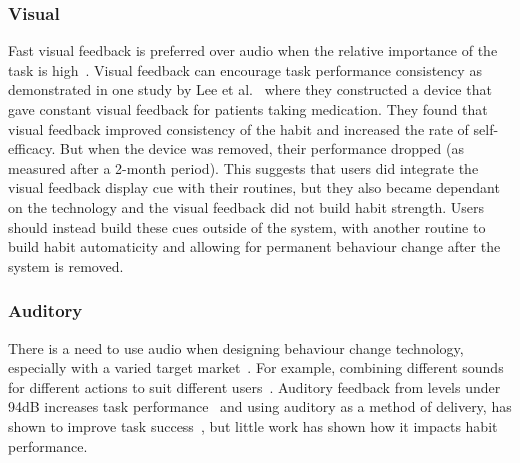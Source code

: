\subsubsection{Visual}
Fast visual feedback is preferred over audio when the relative importance of the task is high~\cite{visual_mode_better}. Visual feedback can encourage task performance consistency as demonstrated in one study by Lee et al.~\cite{article_realtime_feedback_improving_medication_taking} where they constructed a device that gave constant visual feedback for patients taking medication. They found that visual feedback improved consistency of the habit and increased the rate of self-efficacy. But when the device was removed, their performance dropped (as measured after a 2-month period). This suggests that users did integrate the visual feedback display cue with their routines, but they also became dependant on the technology and the visual feedback did not build habit strength. Users should instead build these cues outside of the system, with another routine to build habit automaticity and allowing for permanent behaviour change after the system is removed.

\subsubsection{Auditory}
There is a need to use audio when designing behaviour change technology, especially with a varied target market~\cite{article_designing_for_health_behaviour_change_hci}. For example, combining different sounds for different actions to suit different users~\cite{article_movipill_improving_medication_elders}. Auditory feedback from levels under 94dB increases task performance~\cite{high_audio_feedback_negative_performance} and using auditory as a method of delivery, has shown to improve task success~\cite{auditory_notifications_increase_delivery_success}, but little work has shown how it impacts habit performance.


